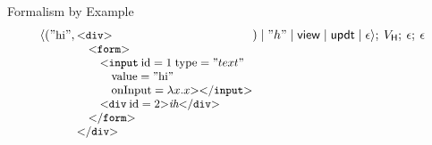 \documentclass[11.5pt, aspectratio=169]{beamer}
\begin{document}
\begin{frame}{Formalism by Example}
{   \[
     \sys{\handlerproc{
    {\small
      ("\text{hi}", \bl
    \ot{div} \\
      \quad \ot{form} \\
      \qquad \htmltag{input}{\attr{id}{1} \; \attr{type}{"text"} \; \\
        \quad \qquad
      \attr{value}{"\text{hi}"}{} \\
        \quad \qquad
      \attr{onInput}{\lambda x . x}}{} \\
      \qquad \opentag{div}{\attr{id}{2}} \textit{ih} \closetag{div} \\
      \quad \ct{form} \\
    \ct{div}  \\
    \el)
  }
   }{"h"}{\mkwd{view}}{\mkwd{updt}}{\epsilon}}{\vh}{\epsilon}{\epsilon}
  \]
  }
%
\end{frame}
\end{document}
